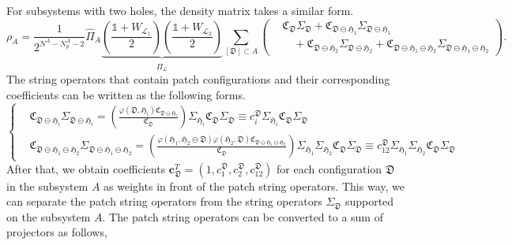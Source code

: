 \documentclass[12font]{article}
\theoremstyle{definition}
\newcommand{\lr}[1]{\left(  #1  \right)}
\begin{document}
For subsystems with two holes, the density matrix takes a similar form.
\[
    \rho_{A}
    =
    \frac{1}{2^{N^A - N^A_p - 2}}
    \hat{\Pi}_A
    \underbrace{
    \lr{\frac{\mathds{1} + W_{\mathcal{L}_1}}{2}}
    \lr{\frac{\mathds{1} + W_{\mathcal{L}_2}}{2}}
    }_{\hat{\Pi}_\mathcal{L}}
    \sum_{[\mathfrak{D}]\subset A}
    \lr{
        \begin{aligned}
            &\mathfrak{C}_\mathfrak{D} \Sigma_\mathfrak{D} 
            +
            \mathfrak{C}_{\mathfrak{D} \ominus \mathfrak{H}_1} \Sigma_{\mathfrak{D}\ominus\mathfrak{H}_1}\\
            &\quad
            +
            \mathfrak{C}_{\mathfrak{D} \ominus \mathfrak{H}_2} \Sigma_{\mathfrak{D}\ominus\mathfrak{H}_2} 
            +
            \mathfrak{C}_{\mathfrak{D} \ominus \mathfrak{H}_1\ominus \mathfrak{H}_2} \Sigma_{\mathfrak{D}\ominus\mathfrak{H}_1\ominus \mathfrak{H}_2}
        \end{aligned}
    }.
\] 
The string operators that contain patch configurations and their corresponding coefficients can be written as the following forms.
\[
\left\{
\begin{aligned}
    & \mathfrak{C}_{\mathfrak{D}\ominus \mathfrak{H}_i } \Sigma_{\mathfrak{D} \ominus\mathfrak{H}_i } = 
    \lr{\frac{\varphi(\mathfrak{D},\mathfrak{H}_i)\mathfrak{C}_{ \mathfrak{D}\ominus\mathfrak{H}_i }}{\mathfrak{C}_{\mathfrak{D}}} }
    \Sigma_{\mathfrak{H}_i}
    \mathfrak{C}_\mathfrak{D} \Sigma_\mathfrak{D} 
    \equiv
    c^\mathfrak{D}_i\Sigma_{\mathfrak{H}_i} \mathfrak{C}_\mathfrak{D} \Sigma_\mathfrak{D}
    \\
    & \mathfrak{C}_{\mathfrak{D}\ominus \mathfrak{H}_1\ominus \mathfrak{H}_2 } \Sigma_{\mathfrak{D} \ominus \mathfrak{H}_1\ominus \mathfrak{H}_2 } 
    = 
    \lr{
    \frac{
        \varphi(\mathfrak{H}_1,\mathfrak{H}_2\ominus\mathfrak{D}) 
        \varphi(\mathfrak{H}_2,\mathfrak{D}) 
        \mathfrak{C}_{ 
            \mathfrak{D}\ominus\mathfrak{H}_1\ominus\mathfrak{H}_2 
        }
    }
    {
        \mathfrak{C}_{\mathfrak{D}}
    } }
    \Sigma_{\mathfrak{H}_1} 
    \Sigma_{\mathfrak{H}_2}
    \mathfrak{C}_\mathfrak{D} \Sigma_\mathfrak{D} 
    \equiv
    c^\mathfrak{D}_{12} \Sigma_{\mathfrak{H}_1} \Sigma_{\mathfrak{H}_2} \mathfrak{C}_\mathfrak{D} \Sigma_\mathfrak{D}
\end{aligned}
\right.
\]
After that, we obtain coefficients $\mathbf{c}_{\mathfrak{D}}^T = (1, c^{\mathfrak{D}}_1, c^\mathfrak{D}_2, c^\mathfrak{D}_{12})$ for each configuration $\mathfrak{D}$ in the subsystem $A$ as weights in front of the patch string operators. This way, we can separate the patch string operators from the string operators $\Sigma_{\mathfrak{D}}$ supported on the subsystem $A$. The patch string operators can be converted to a sum of projectors as follows, 
\end{document}
